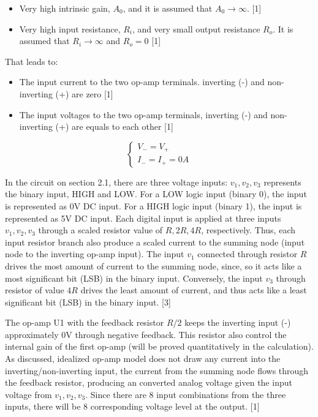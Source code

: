 \documentclass[12pt]{article}
\begin{document}
    \begin{itemize}
        \item Very high intrinsic gain, \(A_0\), and it is assumed that \(A_0 \to \infty \). [1]
        \item Very high input resistance, \(R_i\), and very small output resistance \(R_o\). It is assumed that \(R_i \to \infty\) and \(R_o=0\) [1]
    \end{itemize}

    That leads to: 
    \begin{itemize}
        \item The input current to the two op-amp terminals. inverting (-) and non-inverting (+) are zero [1]
        \item The input voltages to the two op-amp terminals, inverting (-) and non-inverting (+) are equals to each other [1]
    \end{itemize}

    \begin{equation*}
        \begin{cases}
            V_-=V_+ \\ 
            I_-=I_+=0A
        \end{cases}
    \end{equation*}

    In the circuit on section 2.1, there are three voltage inputs: \(v_1,v_2,v_3\) represents the binary input, HIGH and LOW. For a LOW logic input (binary 0), the input is represented as 0V DC input. For a HIGH logic input (binary 1), the input is represented as 5V DC input. Each digital input is applied at three inputs \(v_1,v_2,v_3\) through a scaled resistor value of \(R,2R,4R\), respectively. Thus, each input resistor branch also produce a scaled current to the summing node (input node to the inverting op-amp input). The input \(v_1\) connected through resistor \(R\) drives the most amount of current to the summing node, since, so it acts like a most significant bit (LSB) in the binary input. Conversely, the input \(v_3\) through resistor of value \(4R\) drives the least amount of current, and thus acts like a least significant bit (LSB) in the binary input. [3]


    The op-amp U1 with the feedback resistor \(R/2\) keeps the inverting input (-) approximately 0V  through negative feedback. This resistor also control the internal gain of the first op-amp (will be proved quantitatively in the calculation). As discussed, idealized op-amp model does not draw any current into the inverting/non-inverting input, the current from the summing node flows through the feedback resistor, producing an converted analog voltage given the input voltage from \(v_1,v_2,v_3\). Since there are 8 input combinations from the three inputs, there will be 8 corresponding voltage level at the output. [1]
\end{document}
